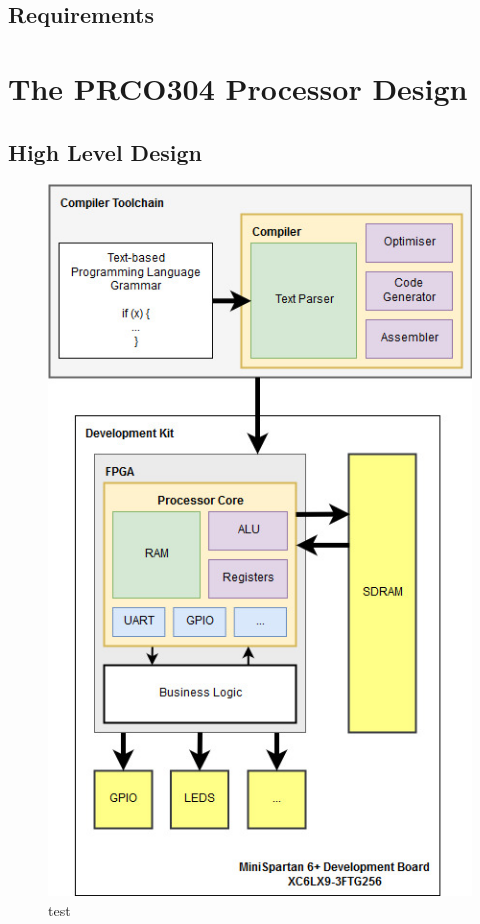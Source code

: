 \documentclass[11pt,a4paper]{report}
\newcommand{\scname}{PRCO304}
\begin{document}
\section{Requirements}

\chapter{The \scname{} Processor Design}
\section{High Level Design}

\begin{figure}[H]
\begin{center}
\includegraphics[scale=0.39]{hld}
\end{center}
\caption{test}
\label{fig:hld}
\end{figure}
\end{document}
